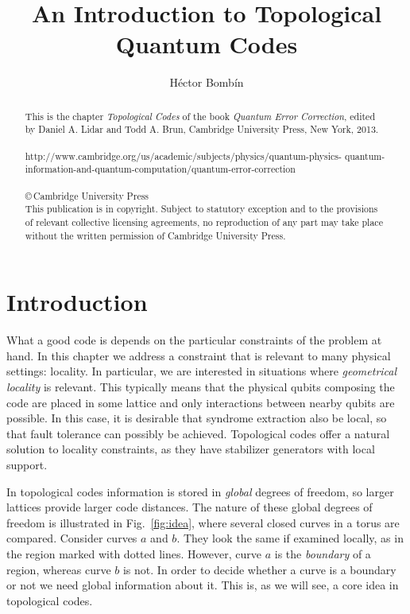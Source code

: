\documentclass{article}
\begin{document}
\date{}
\title{An Introduction to Topological Quantum Codes}
\author{H\'ector Bomb\'in}

\maketitle

\begin{abstract}
This is the chapter \emph{Topological Codes} of the book \emph{Quantum Error Correction}, edited by Daniel A. Lidar and Todd A. Brun, Cambridge University Press, New York, 2013.
\\
\\
http://www.cambridge.org/us/academic/subjects/physics/quantum-physics-
quantum-information-and-quantum-computation/quantum-error-correction
\\
\\
\copyright \,Cambridge University Press
\\
This publication is in copyright. Subject to statutory exception and to the provisions of relevant collective licensing agreements, no reproduction of any part may take place without the written permission of Cambridge University Press.
\end{abstract}

\newpage
\tableofcontents

\newpage

\section{Introduction}

What a good code is depends on the particular constraints of the problem at hand. In this chapter we address a constraint that is relevant to many physical settings: locality. In particular, we are interested in situations where  \emph{geometrical locality} is relevant. This typically means that the physical qubits composing the code are placed in some lattice and only interactions between nearby qubits are possible. In this case, it is desirable that syndrome extraction also be local, so that fault tolerance can possibly be achieved. Topological codes offer a natural solution to locality constraints, as they have stabilizer generators with local support.

In topological codes information is stored in \emph{global} degrees of freedom, so larger lattices provide larger code distances. The nature of these global degrees of freedom is illustrated in Fig.~\ref{fig:idea}, where several closed curves in a torus are compared. Consider curves $a$ and $b$. They look the same if examined locally, as in the region marked with dotted lines. However, curve $a$ is the \emph{boundary} of a region, whereas curve $b$ is not. In order to decide whether a curve is a boundary or not we need global information about it. This is, as we will see, a core idea in topological codes.
\end{document}
